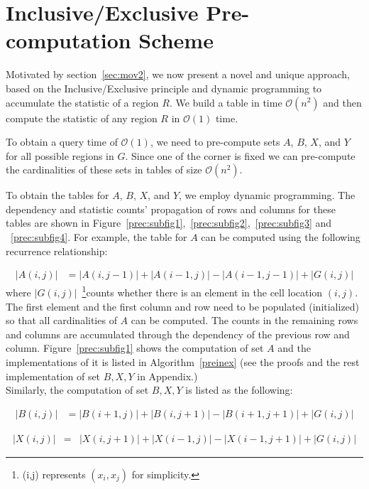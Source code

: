 \documentclass[AMA,LATO1COL]{WileyNJD-v2-bak}
\newcommand\bigo{\mathcal O}
\begin{document}
\section {Inclusive/Exclusive Pre-computation Scheme} \label{DM}

Motivated by section~\ref{sec:mov2}, we now present a novel and unique approach, based on the Inclusive/Exclusive principle and
dynamic programming to accumulate the statistic of a region $R$. We build a table in time $\bigo(n^2)$ and then compute the statistic of any region $R$ in $\bigo(1)$ time.

To obtain a query time of $\bigo(1)$, we need to pre-compute sets $A$, $B$, $X$, and $Y$ for all possible regions in $G$. Since one of the corner is fixed we can pre-compute the cardinalities of these sets in tables of size $\bigo(n^2)$.

To obtain the tables for $A$, $B$, $X$, and $Y$, we employ dynamic programming. The dependency and statistic counts' propagation of rows and columns for these tables are shown in Figure~\ref{prec:subfig1},~\ref{prec:subfig2},~\ref{prec:subfig3} and ~\ref{prec:subfig4}. For example, the table for $A$ can be computed using the following recurrence relationship:


\begin{eqnarray}
|A(i,j)|  &= |A(i,j-1)| + |A(i-1,j)| - |A(i-1,j-1)|  + |G(i,j)|
\end{eqnarray}
\normalsize
where $|G(i,j)|$~\footnote{(i,j) represents $(x_i,x_j)$ for simplicity.}counts whether there is an element in the cell location $(i,j)$. The first element and the first column and row need to be populated (initialized) so that all cardinalities of $A$ can be computed. The counts in the remaining rows and columns are accumulated through the dependency of the previous row and column. Figure~\ref{prec:subfig1} shows the computation of set $A$ and the implementations of it is listed in Algorithm~\ref{preinex} (see the proofs and the rest implementation of set $B,X,Y$ in Appendix.)\\

Similarly, the computation of set $B,X,Y$ is listed as the following:

\begin{eqnarray}
|B(i,j)|  &= |B(i+1,j)| + |B(i,j+1)| - |B(i+1,j+1)| + |G(i,j)|
\end{eqnarray}
\normalsize

\begin{eqnarray}
|X(i,j)|  &= & |X(i,j+1)| + |X(i-1,j)| - |X(i-1,j+1)| + |G(i,j)|
\end{eqnarray}
\normalsize
\end{document}

